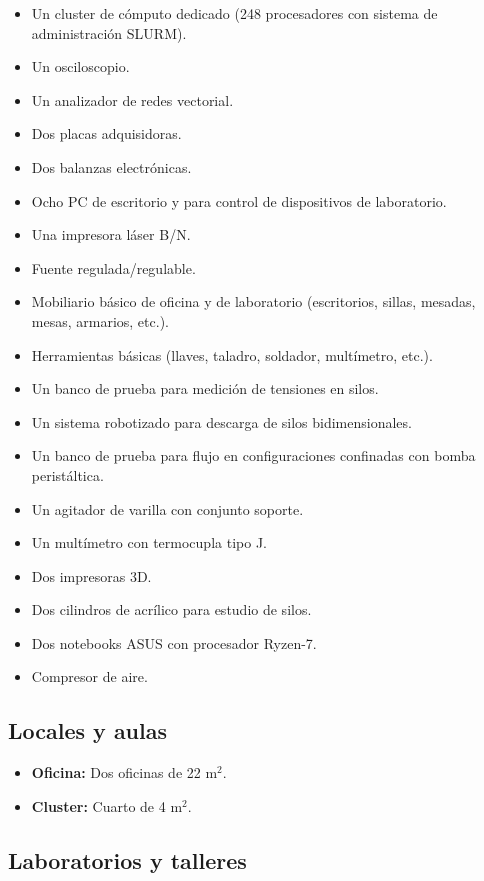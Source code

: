\documentclass[a4paper,11pt,twoside,final,titlepage,onecolumn,openright]{report}
\begin{document}
\begin{itemize}
 \item Un cluster de cómputo dedicado (248 procesadores con sistema de administración SLURM).
 \item Un osciloscopio.
 \item Un analizador de redes vectorial.
 \item Dos placas adquisidoras.
 \item Dos balanzas electrónicas.
 \item Ocho PC de escritorio y para control de dispositivos de laboratorio.
 \item Una impresora láser B/N.
 \item Fuente regulada/regulable.
 \item Mobiliario básico de oficina y de laboratorio (escritorios, sillas, mesadas, mesas, armarios, etc.).
 \item Herramientas básicas (llaves, taladro, soldador, multímetro, etc.).
 \item Un banco de prueba para medición de tensiones en silos.
 \item Un sistema robotizado para descarga de silos bidimensionales.
 \item Un banco de prueba para flujo en configuraciones confinadas con bomba peristáltica.
 \item Un agitador de varilla con conjunto soporte.
 \item Un multímetro con termocupla tipo J.
\item Dos impresoras 3D.
\item Dos cilindros de acrílico para estudio de silos.
\item Dos notebooks ASUS con procesador Ryzen-7.
\item Compresor de aire.
\end{itemize}


\subsection{Locales y aulas}

\begin{itemize}
 \item {\bf Oficina:} Dos oficinas de 22 m$^2$. 
 \item {\bf Cluster:} Cuarto de 4 m$^2$. 
\end{itemize}

\subsection{Laboratorios y talleres}
\end{document}
